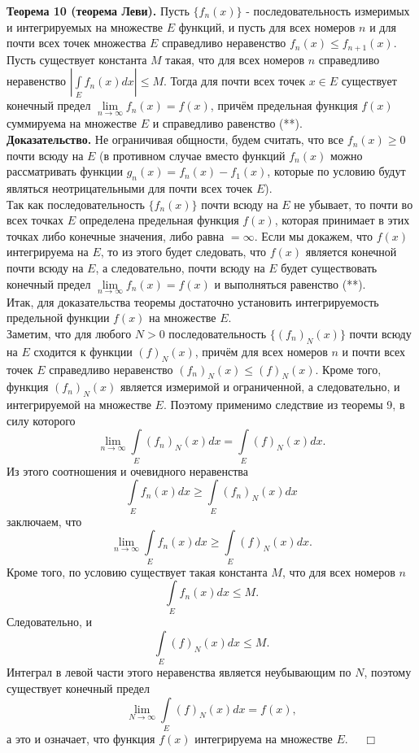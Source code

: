 \documentclass[12pt,a4paper, titlepage]{article}
\begin{document}
\textbf{Теорема 10 (теорема Леви).} Пусть $\lbrace f_n(x) \rbrace$ - последовательность измеримых и интегрируемых на множестве $E$ функций, и пусть для всех номеров $n$ и для почти всех точек множества $E$ справедливо неравенство $f_n(x) \leqslant f_{n+1}(x)$. Пусть существует константа $M$ такая, что для всех номеров $n$ справедливо неравенство $\left| \int\limits_E f_n(x) dx \right| \leqslant M$. Тогда для почти всех точек $x \in E$ существует конечный предел $\lim\limits_{n\to\infty} f_n(x) = f(x)$, причём предельная функция $f(x)$ суммируема на множестве $E$ и справедливо равенство (**).\\
\textbf{Доказательство.} Не ограничивая общности, будем считать, что все $f_n(x) \geqslant 0$ почти всюду на $E$ (в противном случае вместо функций $f_n(x)$ можно рассматривать функции $g_n(x) = f_n(x) - f_1(x)$, которые по условию будут являться неотрицательными для почти всех точек $E$).\\

Так как последовательность $\lbrace f_n(x) \rbrace$ почти всюду на $E$ не убывает, то почти во всех точках $E$ определена предельная функция $f(x)$, которая принимает в этих точках либо конечные значения, либо равна $=\infty$. Если мы докажем, что $f(x)$ интегрируема на $E$, то из этого будет следовать, что $f(x)$ является конечной почти всюду на $E$, а следовательно, почти всюду на $E$ будет существовать конечный предел $\lim\limits_{n\to\infty} f_n(x) = f(x)$ и выполняться равенство (**).\\

Итак, для доказательства теоремы достаточно установить интегрируемость предельной функции $f(x)$ на множестве $E$.\\

Заметим, что для любого $N > 0$ последовательность $\lbrace (f_n)_N(x) \rbrace$ почти всюду на $E$ сходится к функции $(f)_N(x)$, причём для всех номеров $n$ и почти всех точек $E$ справедливо неравенство $(f_n)_N(x) \leqslant (f)_N(x)$. Кроме того, функция $(f_n)_N(x)$ является измеримой и ограниченной, а следовательно, и интегрируемой на множестве $E$. Поэтому применимо следствие из теоремы 9, в силу которого
$$
\lim_{n\to\infty} \int\limits_E (f_n)_N(x) dx = \int\limits_E (f)_N(x) dx.
$$
Из этого соотношения и очевидного неравенства
$$
\int\limits_E f_n(x) dx \geqslant \int\limits_E (f_n)_N(x)dx
$$
заключаем, что
$$
\lim\limits_{n\to\infty} \int\limits_E f_n(x) dx \geqslant \int\limits_E (f)_N(x) dx.
$$
Кроме того, по условию существует такая константа $M$, что для всех номеров $n$
$$
\int\limits_E f_n(x) dx \leqslant M.
$$
Следовательно, и
$$
\int\limits_E (f)_N(x) dx \leqslant M.
$$
Интеграл в левой части этого неравенства является неубывающим по $N$, поэтому существует конечный предел
$$
\lim\limits_{N\to\infty} \int\limits_E (f)_N(x) dx = f(x),
$$
а это и означает, что функция $f(x)$ интегрируема на множестве $E$. $\quad \Box$\\
\end{document}
